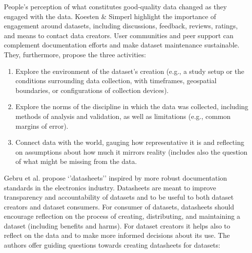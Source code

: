 \documentclass[
]{book}
\providecommand{\tightlist}{%
  \setlength{\itemsep}{0pt}\setlength{\parskip}{0pt}}
\begin{document}
People's perception of what constitutes good-quality data changed as they engaged with the data. Koesten \& Simperl \citep{KoestenSimperl2021_dataUX} highlight the importance of engagement around datasets, including discussions, feedback, reviews, ratings, and means to contact data creators. User communities and peer support can complement documentation efforts and make dataset maintenance sustainable. They, furthermore, propose the three activities:

\begin{enumerate}
\def\labelenumi{\arabic{enumi}.}
\tightlist
\item
  Explore the environment of the dataset's creation (e.g., a study setup or the conditions surrounding data collection, with timeframes, geospatial boundaries, or configurations of collection devices).
\item
  Explore the norms of the discipline in which the data was collected, including methods of analysis and validation, as well as limitations (e.g., common margins of error).
\item
  Connect data with the world, gauging how representative it is and reflecting on assumptions about how much it mirrors reality (includes also the question of what might be missing from the data.
\end{enumerate}

Gebru et al. \citep{Gebruetal2018datasheets} propose `'datasheets'' inspired by more robust documentation standards in the electronics industry. Datasheets are meant to improve transparency and accountability of datasets and to be useful to both dataset creators and dataset consumers.
For consumer of datasets, datasheets should encourage reflection on the process of creating, distributing, and maintaining a dataset (including benefits and harms). For dataset creators it helps also to reflect on the data and to make more informed decisions about its use. The authors offer guiding questions towards creating datasheets for datasets:
\end{document}
